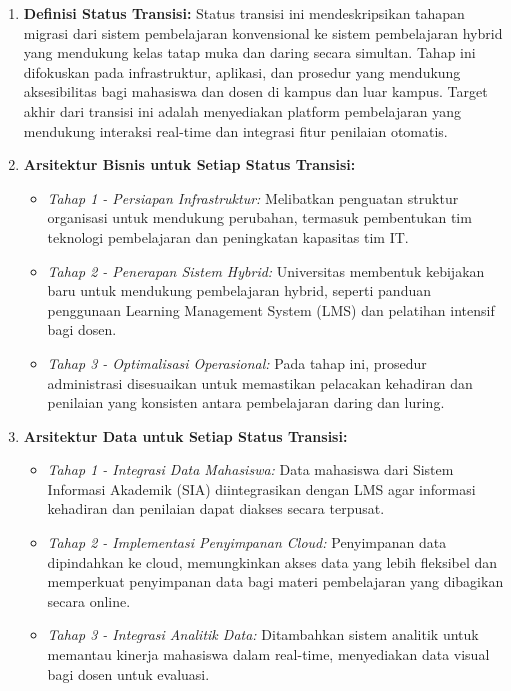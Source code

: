 \begin{enumerate}
	\item \textbf{Definisi Status Transisi:} 
	Status transisi ini mendeskripsikan tahapan migrasi dari sistem pembelajaran konvensional ke sistem pembelajaran hybrid yang mendukung kelas tatap muka dan daring secara simultan. Tahap ini difokuskan pada infrastruktur, aplikasi, dan prosedur yang mendukung aksesibilitas bagi mahasiswa dan dosen di kampus dan luar kampus. Target akhir dari transisi ini adalah menyediakan platform pembelajaran yang mendukung interaksi real-time dan integrasi fitur penilaian otomatis.
	
	\item \textbf{Arsitektur Bisnis untuk Setiap Status Transisi:}
	\begin{itemize}
		\item \textit{Tahap 1 - Persiapan Infrastruktur:} 
		Melibatkan penguatan struktur organisasi untuk mendukung perubahan, termasuk pembentukan tim teknologi pembelajaran dan peningkatan kapasitas tim IT.
		\item \textit{Tahap 2 - Penerapan Sistem Hybrid:} 
		Universitas membentuk kebijakan baru untuk mendukung pembelajaran hybrid, seperti panduan penggunaan Learning Management System (LMS) dan pelatihan intensif bagi dosen.
		\item \textit{Tahap 3 - Optimalisasi Operasional:} 
		Pada tahap ini, prosedur administrasi disesuaikan untuk memastikan pelacakan kehadiran dan penilaian yang konsisten antara pembelajaran daring dan luring.
	\end{itemize}
	
	\item \textbf{Arsitektur Data untuk Setiap Status Transisi:}
	\begin{itemize}
		\item \textit{Tahap 1 - Integrasi Data Mahasiswa:} 
		Data mahasiswa dari Sistem Informasi Akademik (SIA) diintegrasikan dengan LMS agar informasi kehadiran dan penilaian dapat diakses secara terpusat.
		\item \textit{Tahap 2 - Implementasi Penyimpanan Cloud:} 
		Penyimpanan data dipindahkan ke cloud, memungkinkan akses data yang lebih fleksibel dan memperkuat penyimpanan data bagi materi pembelajaran yang dibagikan secara online.
		\item \textit{Tahap 3 - Integrasi Analitik Data:} 
		Ditambahkan sistem analitik untuk memantau kinerja mahasiswa dalam real-time, menyediakan data visual bagi dosen untuk evaluasi.
	\end{itemize}
	

\end{enumerate}
